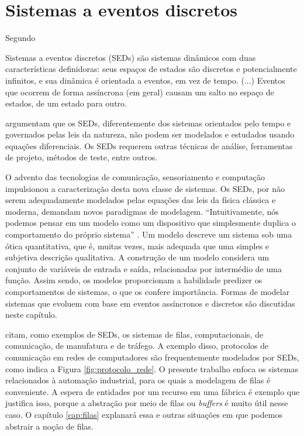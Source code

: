 \chapter{Sistemas a eventos discretos}
\label{cap:seds}

Segundo  \begin{citacao} Sistemas a eventos discretos (\acs{SED}s) são sistemas dinâmicos com duas características definidoras: seus espaços de estados são discretos e potencialmente infinitos, e sua dinâmica é orientada a eventos, em vez de tempo. (...) Eventos que ocorrem de forma assíncrona (em geral) causam um salto no espaço de estados, de um estado para outro. \end{citacao}  argumentam que os SEDs, diferentemente dos sistemas orientados pelo tempo e governados pelas leis da natureza, não podem ser modelados e estudados usando equações diferenciais. Os SEDs requerem outras técnicas de análise, ferramentas de projeto, métodos de teste, entre outros.

O advento das tecnologias de comunicação, sensoriamento e computação impulsionou a caracterização desta nova classe de sistemas. Os SEDs, por não serem adequadamente modelados pelas equações das leis da física clássica e moderna, demandam novos paradigmas de modelagem. ``Intuitivamente, nós podemos pensar em um modelo como um dispositivo que simplesmente duplica o comportamento do próprio sistema'' \cite[p. 3, tradução do autor]{cassandras}. Um modelo descreve um sistema sob uma ótica quantitativa, que é, muitas vezes, mais adequada que uma simples e subjetiva descrição qualitativa. A construção de um modelo considera um conjunto de variáveis de entrada e saída, relacionadas por intermédio de uma função. Assim sendo, os modelos proporcionam a habilidade predizer os comportamentos de sistemas, o que os confere importância. Formas de modelar sistemas que evoluem com base em eventos assíncronos e discretos são discutidas neste capítulo.

 citam, como exemplos de SEDs, os sistemas de filas, computacionais, de comunicação, de manufatura e de tráfego. A exemplo disso, protocolos de comunicação em redes de computadores são frequentemente modelados por SEDs, como indica a Figura \ref{fig:protocolo_rede}. O presente trabalho enfoca os sistemas relacionados à automação industrial, para os quais a modelagem de filas é conveniente. A espera de entidades por um recurso em uma fábrica é exemplo que justifica isso, porque a abstração por meio de filas ou \textit{buffers} é muito útil nesse caso. O capítulo \ref{cap:filas} explanará essa e outras situações em que podemos abstrair a noção de filas.

